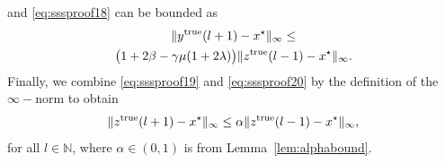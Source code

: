 \documentclass[9pt,shortpaper,twoside,web]{ieeecolor}
\newcommand{\tr}{\textnormal{true}}
\begin{document}
    and \eqref{eq:sssproof18} can be bounded as
    \begin{multline}\label{eq:sssproof20}
        \Vert y^\tr(l+1)-x^\star\Vert_\infty \leq\\ \big(1 + 2\beta -\gamma\mu(1+2\lambda) \big)\Vert z^\tr(l-1)-x^\star\Vert_\infty.
    \end{multline}
    Finally, we combine \eqref{eq:sssproof19} and \eqref{eq:sssproof20} by the definition of the $\infty-$norm to obtain 
    \begin{equation}
        \Vert z^\tr(l+1)-x^\star\Vert_\infty\leq \alpha\Vert z^\tr(l-1)-x^\star\Vert_\infty,
    \end{equation}
    for all $l\in\mathbb{N}$,
    where $\alpha \in (0, 1)$ is from
    Lemma~\ref{lem:alphabound}. 

    
    
\end{document}
